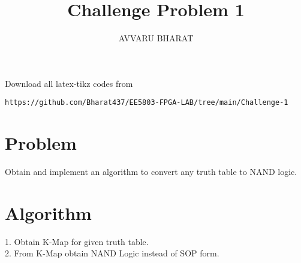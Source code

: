 \documentclass{article}
\begin{document}
     \def\rightbox#1{\makebox[0in][r]{#1}}
     \def\centbox#1{\makebox[0in]{#1}}
     \def\topbox#1{\raisebox{-\baselineskip}[0in][0in]{#1}}
     \def\midbox#1{\raisebox{-0.5\baselineskip}[0in][0in]{#1}}
\vspace{3cm}
\title{Challenge Problem 1}
\author{AVVARU BHARAT}
\date{}
\maketitle
\renewcommand\thefigure{\arabic{figure}}
\setcounter{figure}{0}
\renewcommand{\thetable}{\arabic{table}}
\setcounter{table}{0}
Download all latex-tikz codes from 
%
\begin{lstlisting}
https://github.com/Bharat437/EE5803-FPGA-LAB/tree/main/Challenge-1
\end{lstlisting}
%
\section{Problem}
Obtain and implement an algorithm to convert any truth table to NAND logic.
\section{Algorithm}
1. Obtain K-Map for given truth table.\\
2. From K-Map obtain NAND Logic instead of SOP form.
\end{document}
